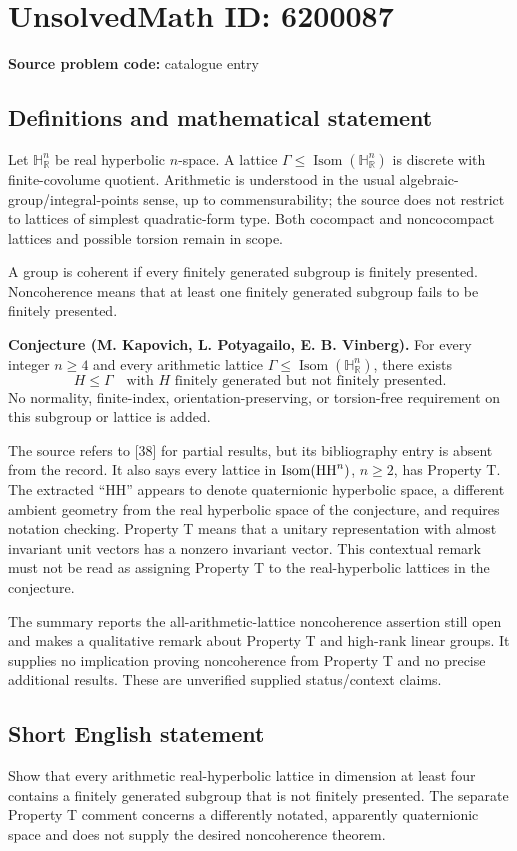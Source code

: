 \documentclass[11pt]{article}
\newcommand{\R}{\mathbb{R}}
\begin{document}
\section*{UnsolvedMath ID: 6200087}
\textbf{Source problem code:} catalogue entry
\subsection{Definitions and mathematical statement}
Let $\mathbb H^n_{\R}$ be real hyperbolic $n$-space. A lattice $\Gamma\leq\operatorname{Isom}(\mathbb H^n_{\R})$ is discrete with finite-covolume quotient. Arithmetic is understood in the usual algebraic-group/integral-points sense, up to commensurability; the source does not restrict to lattices of simplest quadratic-form type. Both cocompact and noncocompact lattices and possible torsion remain in scope.

A group is coherent if every finitely generated subgroup is finitely presented. Noncoherence means that at least one finitely generated subgroup fails to be finitely presented.

\textbf{Conjecture (M. Kapovich, L. Potyagailo, E. B. Vinberg).} For every integer $n\geq4$ and every arithmetic lattice $\Gamma\leq\operatorname{Isom}(\mathbb H^n_{\R})$, there exists
\[
 H\leq\Gamma\quad\text{with $H$ finitely generated but not finitely presented}.
\]
No normality, finite-index, orientation-preserving, or torsion-free requirement on this subgroup or lattice is added.

The source refers to [38] for partial results, but its bibliography entry is absent from the record. It also says every lattice in $\operatorname{Isom}({\rm HH}^n)$, $n\geq2$, has Property T. The extracted ``HH'' appears to denote quaternionic hyperbolic space, a different ambient geometry from the real hyperbolic space of the conjecture, and requires notation checking. Property T means that a unitary representation with almost invariant unit vectors has a nonzero invariant vector. This contextual remark must not be read as assigning Property T to the real-hyperbolic lattices in the conjecture.

The summary reports the all-arithmetic-lattice noncoherence assertion still open and makes a qualitative remark about Property T and high-rank linear groups. It supplies no implication proving noncoherence from Property T and no precise additional results. These are unverified supplied status/context claims.
\subsection{Short English statement}
Show that every arithmetic real-hyperbolic lattice in dimension at least four contains a finitely generated subgroup that is not finitely presented. The separate Property T comment concerns a differently notated, apparently quaternionic space and does not supply the desired noncoherence theorem.
\end{document}
